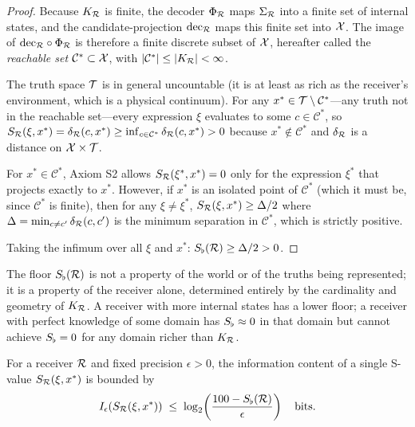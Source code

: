 \begin{proof}
Because $K_{\mathcal{R}}$ is finite, the decoder $\Phi_{\mathcal{R}}$ maps $\Sigma_{\mathcal{R}}$ into a finite set of internal states, and the candidate-projection $\mathrm{dec}_{\mathcal{R}}$ maps this finite set into $\mathcal{X}$. The image of $\mathrm{dec}_{\mathcal{R}} \circ \Phi_{\mathcal{R}}$ is therefore a finite discrete subset of $\mathcal{X}$, hereafter called the \emph{reachable set} $\mathcal{C}^* \subset \mathcal{X}$, with $|\mathcal{C}^*| \leq |K_{\mathcal{R}}| < \infty$.

The truth space $\mathcal{T}$ is in general uncountable (it is at least as rich as the receiver's environment, which is a physical continuum). For any $x^* \in \mathcal{T} \setminus \mathcal{C}^*$---any truth not in the reachable set---every expression $\xi$ evaluates to some $c \in \mathcal{C}^*$, so $S_{\mathcal{R}}(\xi, x^*) = \delta_{\mathcal{R}}(c, x^*) \geq \inf_{c \in \mathcal{C}^*} \delta_{\mathcal{R}}(c, x^*) > 0$ because $x^* \notin \mathcal{C}^*$ and $\delta_{\mathcal{R}}$ is a distance on $\mathcal{X} \times \mathcal{T}$.

For $x^* \in \mathcal{C}^*$, Axiom S2 allows $S_{\mathcal{R}}(\xi^*, x^*) = 0$ only for the expression $\xi^*$ that projects exactly to $x^*$. However, if $x^*$ is an isolated point of $\mathcal{C}^*$ (which it must be, since $\mathcal{C}^*$ is finite), then for any $\xi \neq \xi^*$, $S_{\mathcal{R}}(\xi, x^*) \geq \Delta/2$ where $\Delta = \min_{c \neq c'} \delta_{\mathcal{R}}(c, c')$ is the minimum separation in $\mathcal{C}^*$, which is strictly positive.

Taking the infimum over all $\xi$ and $x^*$: $S_{\flat}(\mathcal{R}) \geq \Delta/2 > 0$.
\end{proof}

\begin{remark}\label{rem:floor-receiver}
The floor $S_{\flat}(\mathcal{R})$ is not a property of the world or of the truths being represented; it is a property of the receiver alone, determined entirely by the cardinality and geometry of $K_{\mathcal{R}}$. A receiver with more internal states has a lower floor; a receiver with perfect knowledge of some domain has $S_{\flat} \approx 0$ in that domain but cannot achieve $S_{\flat} = 0$ for any domain richer than $K_{\mathcal{R}}$.
\end{remark}

\begin{corollary}\label{cor:info-content}
For a receiver $\mathcal{R}$ and fixed precision $\epsilon > 0$, the information content of a single S-value $S_{\mathcal{R}}(\xi, x^*)$ is bounded by
\[
I_\epsilon(S_{\mathcal{R}}(\xi, x^*)) \;\leq\; \log_2\!\left(\frac{100 - S_{\flat}(\mathcal{R})}{\epsilon}\right) \quad \text{bits.}
\]
\end{corollary}

